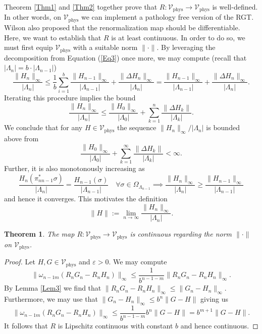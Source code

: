 \documentclass{article}
\newtheorem{theorem}{Theorem}[section]
\newcommand{\phys}{\mathrm{phys}}
\begin{document}
Theorem \ref{Thm1} and \ref{Thm2} together prove that $R:\mathcal{V}_\phys\to \mathcal{V}_\phys$ is well-defined. In other words, on $\mathcal{V}_\phys$ we can implement a pathology free version of the RGT. Wilson also proposed that the renormalization map should be differentiable. Here, we want to establish that $R$ is at least continuous. In order to do so, we must first equip $\mathcal{V}_\phys$ with a suitable norm $\|\cdot\|$. By leveraging the decomposition from Equation (\ref{Eq3}) once more, we may compute (recall that $|\Lambda_n|=b\cdot|\Lambda_{n-1}|$)
\begin{equation}
    \frac{\|H_n\|_\infty}{|\Lambda_n|}\leq\frac{1}{b}\sum_{i=1}^b\frac{\|H_{n-1}\|_\infty}{|\Lambda_{n-1}|}+\frac{\|\Delta H_n\|_\infty}{|\Lambda_n|}=\frac{\|H_{n-1}\|_\infty}{|\Lambda_{n-1}|}+\frac{\|\Delta H_n\|_\infty}{|\Lambda_n|}.
\end{equation}
Iterating this procedure implies the bound
\begin{equation}
    \frac{\|H_n\|_\infty}{|\Lambda_n|}\leq\frac{\|H_0\|_\infty}{|\Lambda_0|}+\sum_{k=1}^n\frac{\|\Delta H_k\|}{|\Lambda_k|}.
\end{equation}
We conclude that for any $H\in \mathcal{V}_\phys$ the sequence $\|H_n\|_\infty/|\Lambda_n|$ is bounded above from 
\begin{equation}
    \frac{\|H_0\|_\infty}{|\Lambda_0|}+\sum_{k=1}^\infty\frac{\|\Delta H_k\|}{|\Lambda_k|}<\infty.
\end{equation}
Further, it is also monotonously increasing as
\begin{equation}
    \frac{H_n(\pi_{nn-1}^*\sigma)}{|\Lambda_n|}=\frac{H_{n-1}(\sigma)}{|\Lambda_{n-1}|}\quad\forall\sigma\in\Omega_{\Lambda_{n-1}}\implies\frac{\|H_n\|_\infty}{|\Lambda_n|}\geq\frac{\|H_{n-1}\|_\infty}{|\Lambda_{n-1}|}
\end{equation}
and hence it converges. This motivates the definition
\begin{equation}
    \|H\|:=\lim_{n\to\infty}\frac{\|H_n\|_\infty}{|\Lambda_n|}.
\end{equation}

\begin{theorem}\label{Thm3}
    The map $R:\mathcal{V}_\phys\to \mathcal{V}_\phys$ is continuous regarding the norm $\|\cdot\|$ on $\mathcal{V}_\phys$.
\end{theorem}

\begin{proof}
    Let $H,G\in \mathcal{V}_\phys$ and $\varepsilon>0$. We may compute
    \begin{equation}
        \|\omega_{n-1m}(R_nG_n-R_nH_n)\|_\infty\leq\frac{1}{b^{n-1-m}}\|R_nG_n-R_nH_n\|_\infty.
    \end{equation}
    By Lemma \ref{Lem3} we find that $\|R_nG_n-R_nH_n\|_\infty\leq\|G_n-H_n\|_\infty$. Furthermore, we may use that $\|G_n-H_n\|_\infty\leq b^n\|G-H\|$ giving us
    \begin{equation}
        \|\omega_{n-1m}(R_nG_n-R_nH_n)\|_\infty\leq\frac{1}{b^{n-1-m}}b^n\|G-H\|=b^{m+1}\|G-H\|.
    \end{equation}
    It follows that $R$ is Lipschitz continuous with constant $b$ and hence continuous.
\end{proof}
\end{document}
